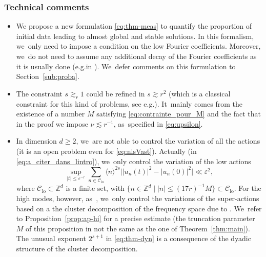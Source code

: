 \documentclass[10pt,a4paper]{amsart}
\providecommand{\eg}{e.g.}
\theoremstyle{plain}
\theoremstyle{definition}
\DeclareMathOperator{\lo}{lo}
\newcommand{\1}{\mathbf{1}}
\newcommand{\Clo}{\mathscr{C}_{\lo}}
\providecommand{\Subsubsection}{\subsubsection}
\providecommand{\Subsubsection}{\subsubsection}
\begin{document}
\Subsubsection{Technical comments}\label{sec:techni}
\begin{itemize}
\item We propose a new formulation \eqref{eq:thm-meas} to quantify the proportion of initial data leading to almost global and stable solutions. In this formalism, we~only need to impose a condition on the low Fourier coefficients. Moreover, we~do not need to assume any additional decay of the Fourier coefficients as it is usually done (\eg in \cite{Bou00,KillBill,KtA,LX23}). We~defer comments on this formulation to Section~\ref{sub:proba}.

\item The constraint $s\gtrsim_r 1$ could be refined in $s \gtrsim r^2$ (which is a classical constraint for this kind of problems, see \eg \cite{KtA}). It~mainly comes from the existence of a number $M$ satisfying \eqref{eq:contrainte_pour_M} and the fact that in the proof we impose $\nu \lesssim r^{-1}$, as~specified in \eqref{eq:upsilon}.
\item In dimension $d\geq 2$, we~are not able to control the variation of all the actions (it is an open problem even for \eqref{eq:nlsVast}). Actually (in \eqref{eq:a_citer_dans_lintro}), we~only control the variation of the low actions
\[
\sup_{|t|\leq \varepsilon^{-r}}\sum_{ n \in \Clo} \langle n \rangle^{2s} \big| |u_n(t)|^2 -|u_n(0)|^2 \big| \ll \varepsilon^2,
\]
where $\Clo \subset \mathbb{Z}^d$ is a finite set, with $\{ n\in \mathbb{Z}^d \mid |n| \leq (17r)^{-1} M \} \subset \Clo$. For the high modes, however, as~\cite{BFM22}, we~only control the variations of the super-actions based on a the cluster decomposition of the frequency space due to \cite{Bou98,Berti-Maspero-19}. We~refer to Proposition~\ref{prop:ap-hi} for a precise estimate (the truncation parameter $M$ of this proposition in not the same as the one of Theorem~\ref{thm:main}). The unusual exponent $2^{s+1}$ in \eqref{eq:thm-dyn} is a consequence of the dyadic structure of the cluster decomposition.
\end{itemize}
\end{document}
